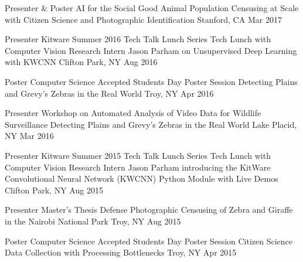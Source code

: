 

\begin{cventries}

  \cventryshort
    {Presenter \& Poster \dotSep AI for the Social Good} %
    {Animal Population Censusing at Scale with Citizen Science and Photographic Identification} %
    {Stanford, CA} %
    {Mar 2017} %

  \cventryshort
    {Presenter \dotSep Kitware Summer 2016 Tech Talk Lunch Series} %
    {Tech Lunch with Computer Vision Research Intern Jason Parham on Unsupervised Deep Learning with KWCNN} %
    {Clifton Park, NY} %
    {Aug 2016} %

  \cventryshort
    {Poster \dotSep Computer Science Accepted Students Day Poster Session} %
    {Detecting Plains and Grevy's Zebras in the Real World} %
    {Troy, NY} %
    {Apr 2016} %

  \cventryshort
    {Presenter \dotSep {} Workshop on Automated Analysis of Video Data for Wildlife Surveillance} %
    {Detecting Plains and Grevy's Zebras in the Real World} %
    {Lake Placid, NY} %
    {Mar 2016} %

  \cventryshort
    {Presenter \dotSep Kitware Summer 2015 Tech Talk Lunch Series} %
    {Tech Lunch with Computer Vision Research Intern Jason Parham introducing the KitWare Convolutional Neural Network (KWCNN) Python Module with Live Demos} %
    {Clifton Park, NY} %
    {Aug 2015} %

  \cventryshort
    {Presenter \dotSep Master's Thesis Defense} %
    {Photographic Censusing of Zebra and Giraffe in the Nairobi National Park} %
    {Troy, NY} %
    {Aug 2015} %

  \cventryshort
    {Poster \dotSep Computer Science Accepted Students Day Poster Session} %
    {Citizen Science Data Collection with Processing Bottlenecks} %
    {Troy, NY} %
    {Apr 2015} %

\end{cventries}
